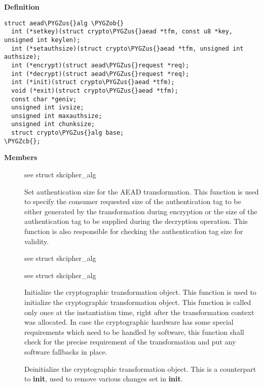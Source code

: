 \documentclass[a4paper,8pt,english]{sphinxmanual}
\def\PYGZus{\char`\_}
\def\PYGZob{\char`\{}
\def\PYGZcb{\char`\}}
\begin{document}
\textbf{Definition}

\begin{Verbatim}[commandchars=\\\{\}]
struct aead\PYGZus{}alg \PYGZob{}
  int (*setkey)(struct crypto\PYGZus{}aead *tfm, const u8 *key, unsigned int keylen);
  int (*setauthsize)(struct crypto\PYGZus{}aead *tfm, unsigned int authsize);
  int (*encrypt)(struct aead\PYGZus{}request *req);
  int (*decrypt)(struct aead\PYGZus{}request *req);
  int (*init)(struct crypto\PYGZus{}aead *tfm);
  void (*exit)(struct crypto\PYGZus{}aead *tfm);
  const char *geniv;
  unsigned int ivsize;
  unsigned int maxauthsize;
  unsigned int chunksize;
  struct crypto\PYGZus{}alg base;
\PYGZcb{};
\end{Verbatim}

\textbf{Members}
\begin{description}
\item[{}] \leavevmode
see struct skcipher\_alg

\item[{}] \leavevmode
Set authentication size for the AEAD transformation. This
function is used to specify the consumer requested size of the
authentication tag to be either generated by the transformation
during encryption or the size of the authentication tag to be
supplied during the decryption operation. This function is also
responsible for checking the authentication tag size for
validity.

\item[{}] \leavevmode
see struct skcipher\_alg

\item[{}] \leavevmode
see struct skcipher\_alg

\item[{}] \leavevmode
Initialize the cryptographic transformation object. This function
is used to initialize the cryptographic transformation object.
This function is called only once at the instantiation time, right
after the transformation context was allocated. In case the
cryptographic hardware has some special requirements which need to
be handled by software, this function shall check for the precise
requirement of the transformation and put any software fallbacks
in place.

\item[{}] \leavevmode
Deinitialize the cryptographic transformation object. This is a
counterpart to \textbf{init}, used to remove various changes set in
\textbf{init}.


\end{description}
\end{document}
